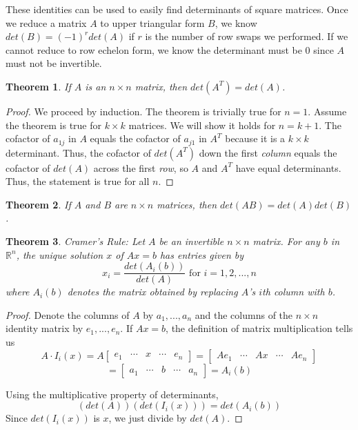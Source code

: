 \documentclass[letterpaper]{article}
\newtheorem{theorem}{Theorem}
\theoremstyle{definition}
\begin{document}
These identities can be used to easily find determinants of square matrices. Once we reduce a matrix $A$ to upper triangular form $B$, we know $det(B) = (-1)^{r} det(A)$ if $r$ is the number of row swaps we performed. If we cannot reduce to row echelon form, we know the determinant must be 0 since $A$ must not be invertible. 

\begin{theorem}
If $A$ is an $n \times n$ matrix, then $det(A^T) = det(A)$.
\end{theorem}

\begin{proof}
We proceed by induction. The theorem is trivially true for $n = 1$. Assume the theorem is true for $k \times k$ matrices. We will show it holds for $n = k +1$. The cofactor of $a_{1j}$ in $A$ equals the cofactor of $a_{j1}$ in $A^T$ because it is a $k \times k$ determinant. Thus, the cofactor of $det(A^T)$ down the first \textit{column} equals the cofactor of  $det(A)$ across the first \textit{row}, so $A$ and $A^T$ have equal determinants. Thus, the statement is true for all $n$. 
\end{proof}

\begin{theorem}
If $A$ and $B$ are $n \times n$ matrices, then $det(AB) = det(A) det(B)$. 
\end{theorem}

\begin{theorem}{Cramer's Rule: }
Let $A$ be an invertible $n \times n$ matrix. For any $b$ in $\mathbb{R}^n$, the unique solution $x$ of $Ax = b$ has entries given by 
$$x_{i} = \frac{det(A_i(b))}{det(A)} \text{ for } i = 1, 2, ..., n$$
where $A_i(b)$ denotes the matrix obtained by replacing $A$'s $i$th column with $b$. 
\end{theorem}

\begin{proof}
Denote the columns of $A$ by $a_1, ..., a_n$ and the columns of the $n \times n$ identity matrix by $e_1, ..., e_n$. If $Ax = b$, the definition of matrix multiplication tells us 
$$A \cdot I_i (x) = A \begin{bmatrix}
e_1 & \cdots & x & \cdots & e_n
\end{bmatrix} = 
\begin{bmatrix}
Ae_1 & \cdots & Ax & \cdots & Ae_n
\end{bmatrix}$$
$$ = \begin{bmatrix}
a_1 & \cdots & b & \cdots & a_n
\end{bmatrix} = A_i (b)$$

Using the multiplicative property of determinants, 
$$ (det(A)) (det(I_i(x))) = det(A_i (b))$$
Since $det(I_i (x))$ is $x$, we just divide by $det(A)$. 
\end{proof}
\end{document}
